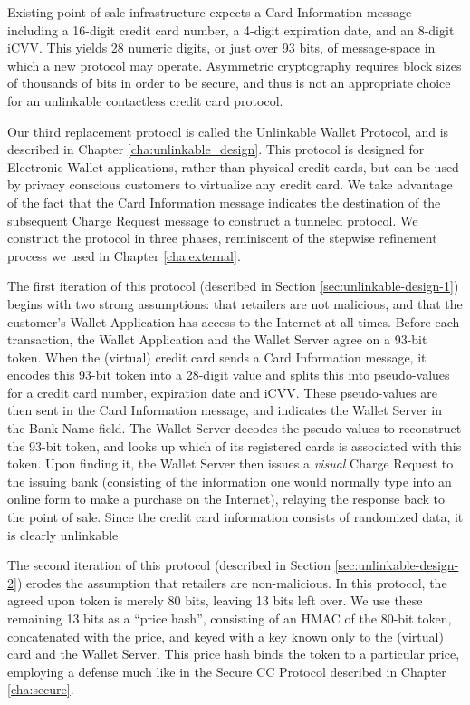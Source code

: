 Existing point of sale infrastructure expects a Card Information message including a 16-digit credit card number, a 4-digit expiration date, and an 8-digit iCVV.
This yields 28 numeric digits, or just over 93 bits, of message-space in which a new protocol may operate.
Asymmetric cryptography requires block sizes of thousands of bits in order to be secure, and thus is not an appropriate choice for an unlinkable contactless credit card protocol.


Our third replacement protocol is called the Unlinkable Wallet Protocol, and is described in Chapter \ref{cha:unlinkable_design}.
This protocol is designed for Electronic Wallet applications, rather than physical credit cards, but can be used by privacy conscious customers to virtualize any credit card.
We take advantage of the fact that the Card Information message indicates the destination of the subsequent Charge Request message to construct a tunneled protocol.
We construct the protocol in three phases, reminiscent of the stepwise refinement process we used in Chapter \ref{cha:external}.

The first iteration of this protocol (described in Section \ref{sec:unlinkable-design-1}) begins with two strong assumptions:
    that retailers are not malicious, and that the customer's Wallet Application has access to the Internet at all times.
Before each transaction, the Wallet Application and the Wallet Server agree on a 93-bit token.
When the (virtual) credit card sends a Card Information message, it encodes this 93-bit token into a 28-digit value and splits this into pseudo-values for a credit card number, expiration date and iCVV.
These pseudo-values are then sent in the Card Information message, and indicates the Wallet Server in the Bank Name field.
The Wallet Server decodes the pseudo values to reconstruct the 93-bit token, and looks up which of its registered cards is associated with this token.
Upon finding it, the Wallet Server then issues a \emph{visual} Charge Request to the issuing bank
    (consisting of the information one would normally type into an online form to make a purchase on the Internet),
    relaying the response back to the point of sale.
Since the credit card information consists of randomized data, it is clearly unlinkable

The second iteration of this protocol (described in Section \ref{sec:unlinkable-design-2}) erodes the assumption that retailers are non-malicious.
In this protocol, the agreed upon token is merely 80 bits, leaving 13 bits left over.
We use these remaining 13 bits as a ``price hash'',
    consisting of an HMAC of the 80-bit token, concatenated with the price, and keyed with a key known only to the (virtual) card and the Wallet Server.
This price hash binds the token to a particular price, employing a defense much like in the Secure CC Protocol described in Chapter \ref{cha:secure}.

